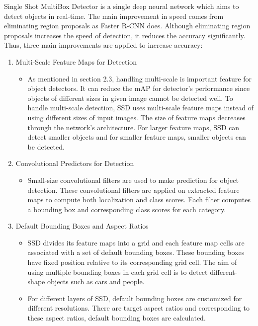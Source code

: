 \documentclass{article}
\begin{document}
\setlength{\parindent}{6ex}

\indent

Single Shot MultiBox Detector is a single deep neural network which aims to detect 
objects in real-time. The main improvement in speed comes from eliminating region 
proposals as Faster R-CNN does. Although eliminating region proposals increases 
the speed of detection, it reduces the accuracy significantly. Thus, three main 
improvements are applied to increase accuracy:
\begin{enumerate}
    \item Multi-Scale Feature Maps for Detection
    \begin{itemize}
        \item As mentioned in section 2.3, handling multi-scale is important feature 
for object detectors. It can reduce the mAP for detector's performance since objects 
of different sizes in given image cannot be detected well. To handle multi-scale detection, 
SSD uses multi-scale feature maps instead of using different sizes of input images. 
The size of feature maps decreases through the network's architecture. For larger feature maps,
SSD can detect smaller objects and for smaller feature maps, smaller objects can be detected.
    \end{itemize}
    \item Convolutional Predictors for Detection
    \begin{itemize}
        \item Small-size convolutional filters are used to make prediction for 
object detection. These convolutional filters are applied on extracted feature maps 
to compute both localization and class scores. Each filter computes a bounding box and 
corresponding class scores for each category.
    \end{itemize}
    \item Default Bounding Boxes and Aspect Ratios
    \begin{itemize}
        \item SSD divides its feature maps into a grid and each feature map cells are 
associated with a set of default bounding boxes. These bounding boxes have fixed position 
relative to its corresponding grid cell. The aim of using multiple bounding boxes 
in each grid cell is to detect different-shape objects such as cars and people.
        \item For different layers of SSD, default bounding boxes are customized for 
different resolutions. There are target aspect ratios and corresponding to these 
aspect ratios, default bounding boxes are calculated.
    \end{itemize}
\end{enumerate}
\end{document}
